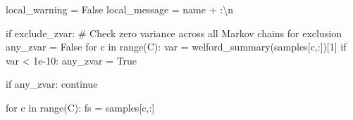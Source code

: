 \documentclass[
  letterpaper,
  DIV=11,
  numbers=noendperiod]{scrartcl}
\newenvironment{Shaded}{\begin{snugshade}}{\end{snugshade}}
\newcommand{\BuiltInTok}[1]{\textcolor[rgb]{0.00,0.23,0.31}{#1}}
\newcommand{\CharTok}[1]{\textcolor[rgb]{0.13,0.47,0.30}{#1}}
\newcommand{\CommentTok}[1]{\textcolor[rgb]{0.37,0.37,0.37}{#1}}
\newcommand{\ControlFlowTok}[1]{\textcolor[rgb]{0.00,0.23,0.31}{#1}}
\newcommand{\DecValTok}[1]{\textcolor[rgb]{0.68,0.00,0.00}{#1}}
\newcommand{\FloatTok}[1]{\textcolor[rgb]{0.68,0.00,0.00}{#1}}
\newcommand{\KeywordTok}[1]{\textcolor[rgb]{0.00,0.23,0.31}{#1}}
\newcommand{\NormalTok}[1]{\textcolor[rgb]{0.00,0.23,0.31}{#1}}
\newcommand{\OperatorTok}[1]{\textcolor[rgb]{0.37,0.37,0.37}{#1}}
\newcommand{\StringTok}[1]{\textcolor[rgb]{0.13,0.47,0.30}{#1}}
\newcommand{\VariableTok}[1]{\textcolor[rgb]{0.07,0.07,0.07}{#1}}
\begin{document}
\begin{Shaded}
\begin{Highlighting}[]
\NormalTok{    local\_warning }\OperatorTok{=} \VariableTok{False}
\NormalTok{    local\_message }\OperatorTok{=}\NormalTok{ name }\OperatorTok{+} \StringTok{\textquotesingle{}:}\CharTok{\textbackslash{}n}\StringTok{\textquotesingle{}}
  
    \ControlFlowTok{if}\NormalTok{ exclude\_zvar:}
      \CommentTok{\# Check zero variance across all Markov chains for exclusion}
\NormalTok{      any\_zvar }\OperatorTok{=} \VariableTok{False}
      \ControlFlowTok{for}\NormalTok{ c }\KeywordTok{in} \BuiltInTok{range}\NormalTok{(C):}
\NormalTok{        var }\OperatorTok{=}\NormalTok{ welford\_summary(samples[c,:])[}\DecValTok{1}\NormalTok{]}
        \ControlFlowTok{if}\NormalTok{ var }\OperatorTok{\textless{}} \FloatTok{1e{-}10}\NormalTok{:}
\NormalTok{          any\_zvar }\OperatorTok{=} \VariableTok{True}
      
      \ControlFlowTok{if}\NormalTok{ any\_zvar:}
        \ControlFlowTok{continue}
    
    \ControlFlowTok{for}\NormalTok{ c }\KeywordTok{in} \BuiltInTok{range}\NormalTok{(C):}
\NormalTok{      fs }\OperatorTok{=}\NormalTok{ samples[c,:]}
      

\end{Highlighting}
\end{Shaded}
\end{document}
